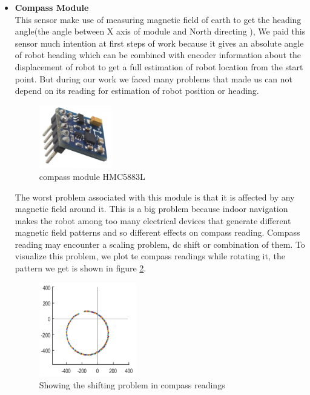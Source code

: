 \documentclass[12pt]{article}
\begin{document}
\begin{itemize}
	
	\item \textbf{Compass Module}\\
	This sensor make use of measuring magnetic field of earth to get the heading angle(the angle between X axis of module and North directing ), We paid this sensor much intention at first steps of work because it gives an absolute angle of robot heading which can be combined with encoder information about the displacement of robot to get a full estimation of robot location from the start point. But during our work we faced many problems that made us can not depend on its reading for estimation of robot position or heading. \\
	\begin{figure}[H]
		\centering
		\includegraphics[width =0.3\textwidth]{Fig/Electronics/compass.jpg}
		\caption{compass module HMC5883L}
		\label{fig:compass}
	\end{figure}
	The worst problem associated with this module is that it is affected by any magnetic field around it. This is a big problem because indoor navigation makes the robot among too many electrical devices that generate different magnetic field patterns and so different effects on compass reading. Compass reading may encounter a scaling problem, dc shift or combination of them.
	To visualize this problem, we plot te compass readings while rotating it, the pattern we get is shown in figure \ref{fig:compass-sh}.\\
	\begin{figure}[H]
		\centering
		\includegraphics[width =0.4\textwidth]{Fig/compass-sh.png}
		\caption{Showing the shifting problem in compass readings}
		\label{fig:compass-sh}

\end{figure}
\end{itemize}
\end{document}

